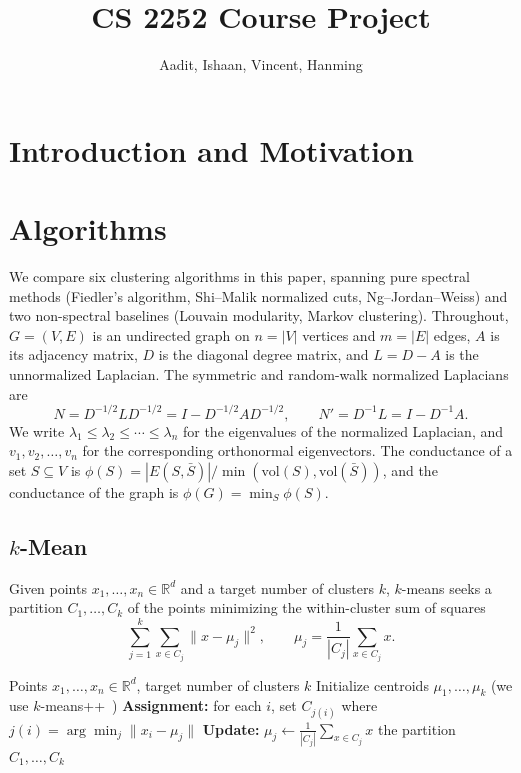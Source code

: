\documentclass{article}
\title{CS 2252 Course Project}
\author{%
Aadit, Ishaan, Vincent, Hanming
\\
}
\theoremstyle{definition}
\theoremstyle{remark}
\begin{document}
\maketitle


\section{Introduction and Motivation}

\section{Algorithms}

We compare six clustering algorithms in this paper, spanning pure spectral methods (Fiedler's algorithm, Shi--Malik normalized cuts, Ng--Jordan--Weiss) and two non-spectral baselines (Louvain modularity, Markov clustering). Throughout, $G = (V, E)$ is an undirected graph on $n = |V|$ vertices and $m = |E|$ edges, $A$ is its adjacency matrix, $D$ is the diagonal degree matrix, and $L = D - A$ is the unnormalized Laplacian. The symmetric and random-walk normalized Laplacians are
\[
N = D^{-1/2} L D^{-1/2} = I - D^{-1/2} A D^{-1/2}, \qquad N' = D^{-1} L = I - D^{-1} A.
\]
We write $\lambda_1 \le \lambda_2 \le \cdots \le \lambda_n$ for the eigenvalues of the normalized Laplacian, and $v_1, v_2, \ldots, v_n$ for the corresponding orthonormal eigenvectors. The conductance of a set $S \subseteq V$ is $\phi(S) = |E(S, \bar S)| / \min(\mathrm{vol}(S), \mathrm{vol}(\bar S))$, and the conductance of the graph is $\phi(G) = \min_S \phi(S)$.

\subsection{$k$-Mean}

Given points $x_1, \ldots, x_n \in \mathbb{R}^d$ and a target number of clusters $k$, $k$-means seeks a partition $C_1, \ldots, C_k$ of the points minimizing the within-cluster sum of squares
\[
\sum_{j=1}^k \sum_{x \in C_j} \|x - \mu_j\|^2, \qquad \mu_j = \frac{1}{|C_j|} \sum_{x \in C_j} x.
\]

\begin{algorithm}[H]
\caption{$k$-Means}
\begin{algorithmic}[1]
\Require Points $x_1, \ldots, x_n \in \mathbb{R}^d$, target number of clusters $k$
\State Initialize centroids $\mu_1, \ldots, \mu_k$ (we use $k$-means++~\cite{arthur2007})
\Repeat
    \State \textbf{Assignment:} for each $i$, set $C_{j(i)}$ where $j(i) = \arg\min_j \|x_i - \mu_j\|$
    \State \textbf{Update:} $\mu_j \gets \frac{1}{|C_j|} \sum_{x \in C_j} x$
\State \Return the partition $C_1, \ldots, C_k$
\end{algorithmic}
\end{algorithm}
\end{document}
